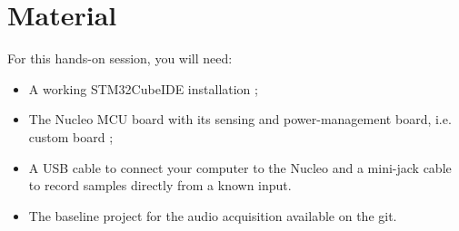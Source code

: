 \section*{Material}

\begin{comment}[couleur = gray!20, arrondi = 0.2, logo=\bcinfo]{}
\vspace{0.2cm}
\end{comment}
For this hands-on session, you will need:
\begin{itemize}
    \item A working STM32CubeIDE installation ;
    \item The Nucleo MCU board with its sensing and power-management board, i.e. custom board ;
    \item A USB cable to connect your computer to the Nucleo and a mini-jack cable to record samples directly from a known input.
    \item The baseline project for the audio acquisition available on the git.
\end{itemize}
